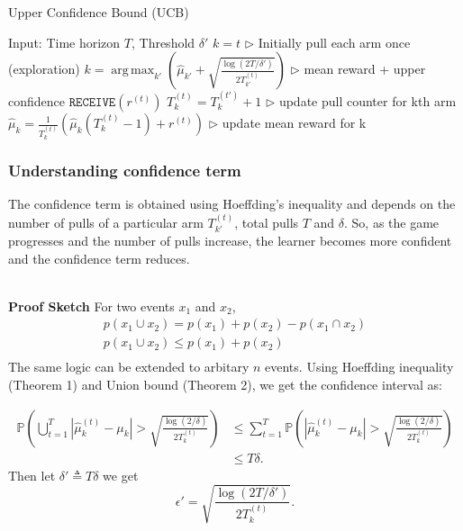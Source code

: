 \documentclass[11pt]{article}
\DeclareMathOperator*{\argmax}{arg\,max}
\begin{document}
\begin{algorithm}[H]
\caption{Upper Confidence Bound (UCB) }
\label{algo:ucb}
\begin{algorithmic}[1]
\STATE Input: Time horizon $T$, Threshold $\delta'$
\STATE $k = t$ \hfill $\triangleright$ Initially pull each arm once (exploration)
\ELSE
\STATE $k = \argmax_{k'} \left(\hat{\mu}_{k'
} + \sqrt{\frac{\log(2T/\delta')}{2T_{k'}^{(t)}}} \right)$ \hfill $\triangleright$ mean reward + upper confidence
\ENDIF
\STATE $\mathtt{RECEIVE}(r^{(t)})$
\STATE $T_k^{(t)} = T_k^{(t')} + 1$  \hfill $\triangleright$ update pull counter for kth arm
\STATE $\hat{\mu}_{k} = \frac{1}{T_k^{(t)}}\left(\hat{\mu}_{k}(T_k^{(t)} - 1) + r^{(t)}\right)$ \hfill $\triangleright$ update mean reward for k
\ENDFOR
\end{algorithmic}
\end{algorithm}

\subsubsection{Understanding confidence term}
The confidence term is obtained using Hoeffding's inequality and depends on the number of pulls of a particular arm $T_{k'}^{(t)}$, total pulls $T$ and $\delta$. So, as the game progresses and the number of pulls increase, the learner becomes more confident and the confidence term reduces.

\\


\normalfont\textbf{Proof Sketch} For two events $x_1$ and $x_2$, 
\begin{align*}
    p(x_1 \cup x_2) = p(x_1) + p(x_2) - p(x_1 \cap x_2)\\
p(x_1 \cup x_2) \le p(x_1) + p(x_2)\\
\end{align*}
The same logic can be extended to arbitary $n$ events. Using Hoeffding inequality (Theorem 1) and Union bound (Theorem 2), we get the confidence interval as:

\begin{align*}
    \mathbb{P}\left( \bigcup_{t=1}^{T} |\widehat{\mu}_k^{(t)} - \mu_k| > \sqrt{\frac{\log(2/\delta)}{2T^{(t)}_k}} \right) &\leq \sum_{t=1}^T \mathbb{P}\left(  |\widehat{\mu}_k^{(t)} - \mu_k| > \sqrt{\frac{\log(2/\delta)}{2T^{(t)}_k}} \right)\\
    &\leq T\delta.
\end{align*}
Then let $\delta' \triangleq T\delta$ we get 
\begin{equation}
    \epsilon' = \sqrt{\frac{\log(2T/\delta')}{2T^{(t)}_k}}.
\label{union_heoff}
\end{equation}
\end{document}
